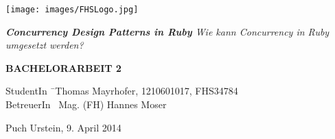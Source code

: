 \begin{titlepage}
\begin{center}

\texttt{[image: images/FHSLogo.jpg]}

\vspace*{4cm}

\Large{
	\textit{
		\textbf{Concurrency Design Patterns in Ruby} 
		\linebreak 
		Wie kann Concurrency in Ruby umgesetzt werden?
	}
}

\vspace*{4cm}

\large{
	\textbf{BACHELORARBEIT 2}
}

\end{center}

\vfill

\begin{tabbing}
StudentIn \= \ Thomas Mayrhofer, 1210601017, FHS34784 \\
BetreuerIn \> \ Mag. (FH) Hannes Moser
\end{tabbing}

Puch Urstein, 9. April 2014

\end{titlepage}